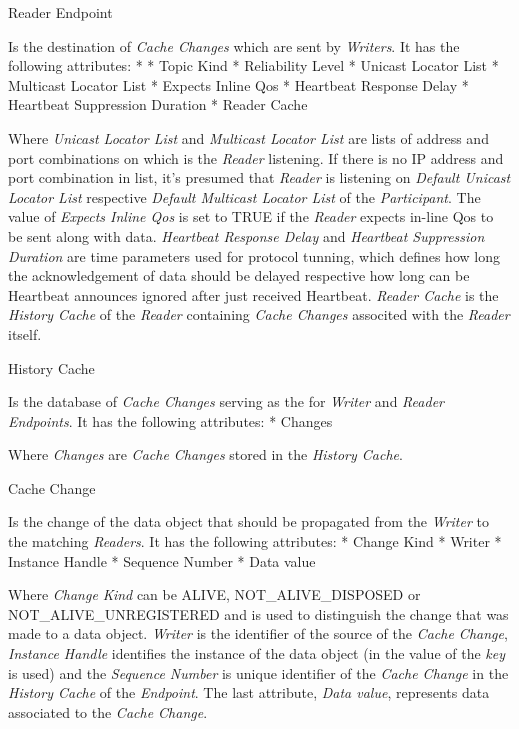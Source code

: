 \secc Reader Endpoint

Is the destination of {\em Cache Changes} which are sent by {\em Writers}. It has the following attributes:
\begitems
* 
* Topic Kind
* Reliability Level
* Unicast Locator List
* Multicast Locator List
* Expects Inline Qos
* Heartbeat Response Delay
* Heartbeat Suppression Duration
* Reader Cache
\enditems

Where {\em Unicast Locator List} and {\em Multicast Locator List} are lists of  address and port combinations on which is the {\em Reader} listening. If there is no IP address and port combination in list, it's presumed that {\em Reader} is listening on {\em Default Unicast Locator List} respective {\em Default Multicast Locator List} of the {\em Participant}. The value of {\em Expects Inline Qos} is set to TRUE if the {\em Reader} expects in-line Qos to be sent along with data. {\em Heartbeat Response Delay} and {\em Heartbeat Suppression Duration} are time parameters used for protocol tunning, which defines how long the acknowledgement of data should be delayed respective how long can be Heartbeat announces ignored after just received Heartbeat. {\em Reader Cache} is the {\em History Cache} of the {\em Reader} containing {\em Cache Changes} associted with the {\em Reader} itself.

\secc History Cache

Is the database of {\em Cache Changes} serving as the  for {\em Writer} and {\em Reader} {\em Endpoints}. It has the following attributes:
\begitems
* Changes
\enditems

Where {\em Changes} are {\em Cache Changes} stored in the {\em History Cache}.

\secc Cache Change

Is the change of the data object that should be propagated from the {\em Writer} to the matching {\em Readers}. It has the following attributes:
\begitems
* Change Kind
* Writer 
* Instance Handle
* Sequence Number
* Data value
\enditems

Where {\em Change Kind} can be ALIVE, NOT\_ALIVE\_DISPOSED or NOT\_ALIVE\_UNREGISTERED and is used to distinguish the change that was made to a data object. {\em Writer } is the identifier of the source of the {\em Cache Change}, {\em Instance Handle} identifies the instance of the data object (in  the value of the {\em key} is used) and the {\em Sequence Number} is unique identifier of the {\em Cache Change} in the {\em History Cache} of the {\em Endpoint}. The last attribute, {\em Data value}, represents data associated to the {\em Cache Change}.

